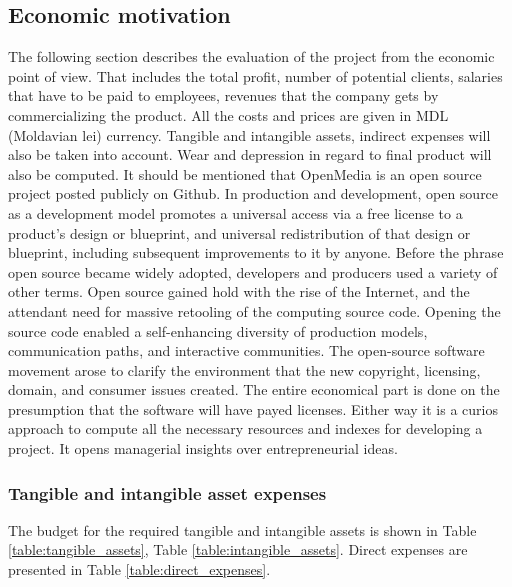 \subsection{Economic motivation}
The following section describes the evaluation of the project from the economic point of view. That includes the total profit, number of potential clients, salaries that have to be paid to employees, revenues that the company gets by commercializing the product. All the costs and prices are given in MDL (Moldavian lei) currency. Tangible and intangible assets, indirect expenses will also be taken into account. Wear and depression in regard to final product will also be computed. It should be mentioned that OpenMedia is an open source project posted publicly on Github. In production and development, open source as a development model promotes a universal access via a free license to a product's design or blueprint, and universal redistribution of that design or blueprint, including subsequent improvements to it by anyone. Before the phrase open source became widely adopted, developers and producers used a variety of other terms. Open source gained hold with the rise of the Internet, and the attendant need for massive retooling of the computing source code. Opening the source code enabled a self-enhancing diversity of production models, communication paths, and interactive communities. The open-source software movement arose to clarify the environment that the new copyright, licensing, domain, and consumer issues created. The entire economical part is done on the presumption that the software will have payed licenses. Either way it is a curios approach to compute all the necessary resources and indexes for developing a project. It opens managerial insights over entrepreneurial ideas.


\subsubsection{Tangible and intangible asset expenses}
The budget for the required tangible and intangible assets is shown in Table \ref{table:tangible_assets}, Table \ref{table:intangible_assets}. Direct expenses are presented in Table \ref{table:direct_expenses}.

